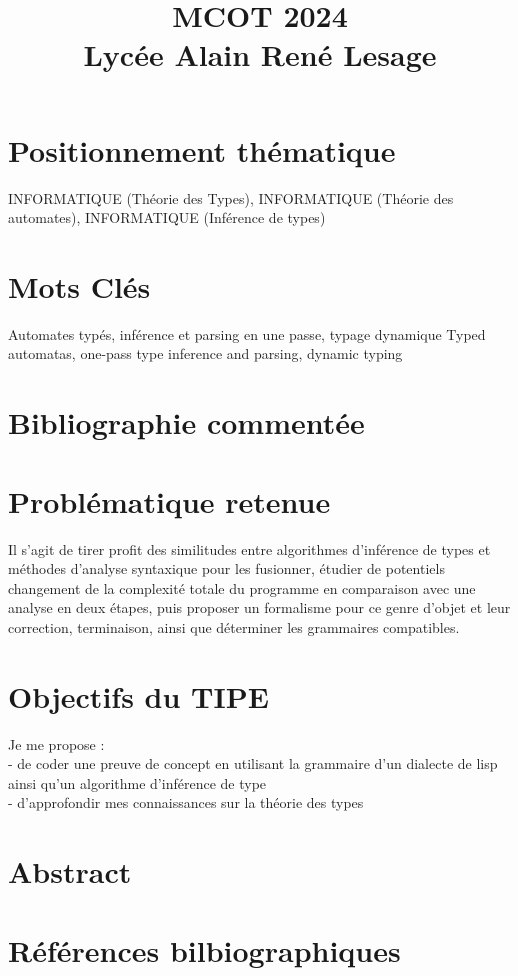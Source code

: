 \documentclass{report}
\title{
		{MCOT 2024}\\
		{\large Lycée Alain René Lesage}\\
}
\begin{document}
\maketitle

\section{Positionnement thématique}
INFORMATIQUE (Théorie des Types), INFORMATIQUE (Théorie des automates), INFORMATIQUE (Inférence de types)

\section{Mots Clés}
Automates typés, inférence et parsing en une passe, typage dynamique
Typed automatas, one-pass type inference and parsing, dynamic typing

\section{Bibliographie commentée}

\section{Problématique retenue}
Il s'agit de tirer profit des similitudes entre algorithmes d'inférence de types et méthodes d'analyse syntaxique pour les fusionner, étudier de potentiels changement de la complexité totale du programme en comparaison avec une analyse en deux étapes, puis proposer un formalisme pour ce genre d'objet et leur correction, terminaison, ainsi que déterminer les grammaires compatibles.

\section{Objectifs du TIPE}
Je me propose : \\
- de coder une preuve de concept en utilisant la grammaire d'un dialecte de lisp ainsi qu'un algorithme d'inférence de type \\
- d'approfondir mes connaissances sur la théorie des types \\

\section{Abstract}

\section{Références bilbiographiques}
\printbibliography 
\end{document}
